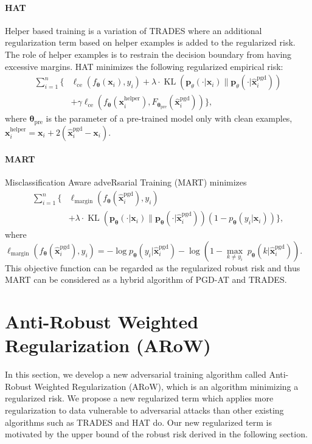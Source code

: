 \documentclass[nohyperref]{article}
\theoremstyle{plain}
\theoremstyle{definition}
\theoremstyle{remark}
\begin{document}
\paragraph{HAT}
Helper based training \citep{rade2022reducing} is a variation of TRADES where an additional regularization term based on helper examples
is added to the regularized risk. The role of helper examples is to restrain the decision boundary from
having excessive margins. HAT minimizes the following regularized empirical risk:
\begin{align}
   \sum_{i=1}^{n} \Bigg\{ & \ell_{\text{ce}}\left(f_{\bm{\theta}}\left(\bm{x}_{i}\right), y_{i}\right)+ \lambda \cdot \operatorname{KL}\left(\mathbf{p}_{\theta}\left(\cdot | \bm{x}_{i}\right) \| \mathbf{p}_{\theta} (\cdot | \widehat{\bm{x}}^{\text{pgd}}_{i})\right) \nonumber \\
   & +\gamma \ell_{\text{ce}}\left(f_{\bm{\theta}}(\bm{x}_{i}^{\text{helper}}), F_{\bm{\theta}_{\text{pre}}}(\widehat{\bm{x}}^{\text{pgd}}_{i})
    \right) \Bigg\} \label{hat},
\end{align}
where $\bm{\theta}_{\text{pre}}$ is the parameter of a pre-trained model only with clean examples, 
$\bm{x}_{i}^{\text{helper}} = \bm{x}_i +2 (\widehat{\bm{x}}^{\text{pgd}}_{i} - \bm{x}_i)$.

\paragraph{MART}
Misclassification Aware adveRsarial Training (MART) \citep{wang2020improving} minimizes
\begin{align}
    \sum\limits_{i=1}^n \bigg\{ & \ell_{\text{margin}}(f_{\bm{\theta}}(\widehat{\bm{x}}^{\text{pgd}}_i), y_i) \nonumber \\
    & + \lambda \cdot  \operatorname{KL}(\mathbf{p}_{\bm{\theta}}(\cdot|\bm{x}_i) \lVert \mathbf{p}_{\bm{\theta}}(\cdot|\bm{\widehat{x}}^{\text{pgd}}_{i})) (1- p_{\bm{\theta}}(y_i|\bm{x}_i)) \bigg\}, \label{mart}
\end{align}
where $\ell_{\text{margin}}(f_{\bm{\theta}}(\widehat{\bm{x}}^{\text{pgd}}_i), y_i) = -\log p_{\bm{\theta}}(y_i|\widehat{\bm{x}}^{\text{pgd}}_i)-\log(1-\underset{k \neq y_i}{\max}\; p_{\bm{\theta}}(k|\widehat{\bm{x}}^{\text{pgd}}_i))$.
This objective function can be regarded as the regularized robust risk and thus
MART can be considered as a hybrid algorithm of PGD-AT and TRADES.
\section{Anti-Robust Weighted Regularization (ARoW)}
In this section, we develop a new adversarial training algorithm called Anti-Robust Weighted Regularization (ARoW), which is an algorithm
minimizing a regularized risk. We propose
a new regularized term which applies
more regularization to data vulnerable to
adversarial attacks than other existing algorithms such as TRADES and HAT do.
Our new regularized term is motivated by the upper bound of the robust risk derived in the following section.
\end{document}

